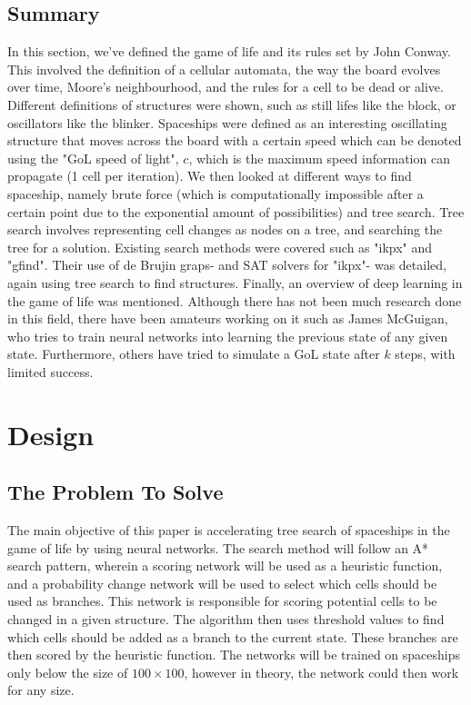 \documentclass{l4proj}
\begin{document}
\section{Summary}

In this section, we've defined the game of life and its rules set by John Conway. This involved the definition of a cellular automata, the way the board evolves over time, Moore's neighbourhood, and the rules for a cell to be dead or alive. Different definitions of structures were shown, such as still lifes like the block, or oscillators like the blinker. Spaceships were defined as an interesting oscillating structure that moves across the board with a certain speed which can be denoted using the "GoL speed of light", $c$, which is the maximum speed information can propagate (1 cell per iteration). We then looked at different ways to find spaceship, namely brute force (which is computationally impossible after a certain point due to the exponential amount of possibilities) and tree search. Tree search involves representing cell changes as nodes on a tree, and searching the tree for a solution. Existing search methods were covered such as "ikpx" and "gfind". Their use of de Brujin graps- and SAT solvers for "ikpx"- was detailed, again using tree search to find structures. Finally, an overview of deep learning in the game of life was mentioned. Although there has not been much research done in this field, there have been amateurs working on it such as James McGuigan, who tries to train neural networks into learning the previous state of any given state. Furthermore, others have tried to simulate a GoL state after $k$ steps, with limited success.

\chapter{Design}

\section{The Problem To Solve}

The main objective of this paper is accelerating tree search of spaceships in the game of life by using neural networks. The search method will follow an A* search pattern, wherein a scoring network will be used as a heuristic function, and a probability change network will be used to select which cells should be used as branches. This network is responsible for scoring potential cells to be changed in a given structure. The algorithm then uses threshold values to find which cells should be added as a branch to the current state. These branches are then scored by the heuristic function. The networks will be trained on spaceships only below the size of $100 \times 100$, however in theory, the network could then work for any size.
\end{document}
